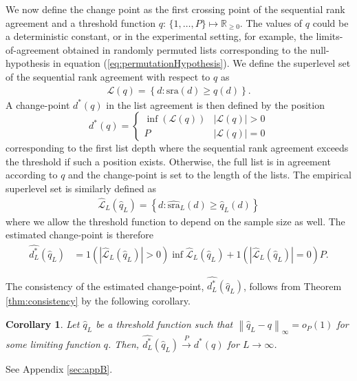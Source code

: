 \documentclass[12pt,a4paper]{article}
\theoremstyle{plain}
\newtheorem{corollary}{Corollary}
\begin{document}
We now define the change point as the first crossing point of the
sequential rank agreement and a threshold function
$q\colon\,\{1,\ldots,P\} \mapsto \mathbb{R}_{\geq 0}$. The values of
$q$ could be a deterministic constant, or in the experimental setting,
for example, the limits-of-agreement obtained in randomly permuted
lists corresponding to the null-hypothesis in equation
(\ref{eq:permutationHypothesis}). We define the superlevel set of the
sequential rank agreement with respect to $q$ as
\begin{align}
  \mathcal{L}(q) = \left\{d : \textrm{sra}(d) \geq q(d)\right\}.
\end{align}
A change-point $d^\ast(q)$ in the list agreement is then defined by the position
\begin{equation}
  d^\ast(q) =
  \begin{cases}
    \inf(\mathcal{L}(q)) & |\mathcal{L}(q)| > 0\\
  P & |\mathcal{L}(q)| = 0
  \end{cases}
\end{equation}
corresponding to the first list depth where the sequential rank
agreement exceeds the threshold if such a position exists. Otherwise,
the full list is in agreement according to $q$ and the change-point is
set to the length of the lists. The empirical superlevel set is
similarly defined as
\begin{align}
 \widehat{\mathcal{L}}_L(\widehat{q}_L) = \left\{d : \widehat{\textrm{sra}}_L(d) \geq \widehat{q}_L(d)\right\}
\end{align}
where we allow the threshold function to depend on the sample size as
well. The estimated change-point is therefore
\begin{align}
  \widehat{d^\ast_L}(\widehat{q}_L) &= 1(|\widehat{\mathcal{L}}_L(\widehat{q}_L)| > 0)\inf \widehat{\mathcal{L}}_L(\widehat{q}_L) + 1(|\widehat{\mathcal{L}}_L(\widehat{q}_L)| = 0)P.
\end{align}

The consistency of the estimated change-point, $\widehat{d^\ast_L}(\widehat{q}_L)$, follows from Theorem \ref{thm:consistency} by the following corollary. 
\begin{corollary}\label{thecor}
Let $\widehat{q}_L$ be a threshold function such that $\left\|\widehat{q}_L - q\right\|_\infty = o_P(1)$ for some limiting
function $q$.  Then, $\widehat{d^\ast_L}(\widehat{q}_L) \overset{P}{\longrightarrow} d^\ast(q)$ for $L \rightarrow \infty$.
\label{cor:consistency}
\end{corollary}
\proof See Appendix \ref{sec:appB}.
\end{document}
